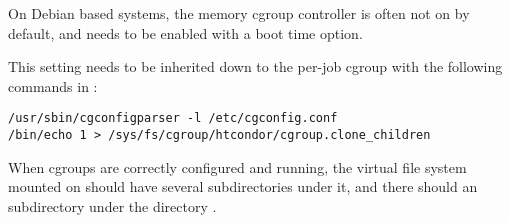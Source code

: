
%



On Debian based systems, the memory cgroup controller is often not 
on by default, and needs to be enabled with a boot time option.

This setting needs to be inherited
down to the per-job cgroup with the following commands in :

\begin{verbatim}
/usr/sbin/cgconfigparser -l /etc/cgconfig.conf
/bin/echo 1 > /sys/fs/cgroup/htcondor/cgroup.clone_children
\end{verbatim}






When cgroups are correctly configured and running, the virtual file system
mounted on  should have several subdirectories under it, 
and there should an  subdirectory under the directory 
.

